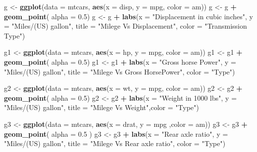 \documentclass[
]{article}
\newenvironment{Shaded}{\begin{snugshade}}{\end{snugshade}}
\newcommand{\DataTypeTok}[1]{\textcolor[rgb]{0.13,0.29,0.53}{#1}}
\newcommand{\FloatTok}[1]{\textcolor[rgb]{0.00,0.00,0.81}{#1}}
\newcommand{\KeywordTok}[1]{\textcolor[rgb]{0.13,0.29,0.53}{\textbf{#1}}}
\newcommand{\NormalTok}[1]{#1}
\newcommand{\OperatorTok}[1]{\textcolor[rgb]{0.81,0.36,0.00}{\textbf{#1}}}
\newcommand{\StringTok}[1]{\textcolor[rgb]{0.31,0.60,0.02}{#1}}
\begin{document}
\begin{Shaded}
\begin{Highlighting}[]
\NormalTok{g <-}\StringTok{ }\KeywordTok{ggplot}\NormalTok{(}\DataTypeTok{data =}\NormalTok{ mtcars, }\KeywordTok{aes}\NormalTok{(}\DataTypeTok{x =}\NormalTok{ disp, }\DataTypeTok{y =}\NormalTok{ mpg, }\DataTypeTok{color =}\NormalTok{ am))}
\NormalTok{g <-}\StringTok{ }\NormalTok{g }\OperatorTok{+}\StringTok{ }\KeywordTok{geom_point}\NormalTok{( }\DataTypeTok{alpha =} \FloatTok{0.5}\NormalTok{)}
\NormalTok{g <-}\StringTok{ }\NormalTok{g }\OperatorTok{+}\StringTok{ }\KeywordTok{labs}\NormalTok{(}\DataTypeTok{x =} \StringTok{"Displacement in cubic inches"}\NormalTok{, }\DataTypeTok{y =} \StringTok{"Miles/(US) gallon"}\NormalTok{, }\DataTypeTok{title =} \StringTok{"Milege Vs Displacement"}\NormalTok{, }\DataTypeTok{color =} \StringTok{"Transmission Type"}\NormalTok{)}

\NormalTok{g1 <-}\StringTok{ }\KeywordTok{ggplot}\NormalTok{(}\DataTypeTok{data =}\NormalTok{ mtcars, }\KeywordTok{aes}\NormalTok{(}\DataTypeTok{x =}\NormalTok{ hp, }\DataTypeTok{y =}\NormalTok{ mpg, }\DataTypeTok{color =}\NormalTok{ am))}
\NormalTok{g1 <-}\StringTok{ }\NormalTok{g1 }\OperatorTok{+}\StringTok{ }\KeywordTok{geom_point}\NormalTok{( }\DataTypeTok{alpha =} \FloatTok{0.5}\NormalTok{)}
\NormalTok{g1 <-}\StringTok{ }\NormalTok{g1 }\OperatorTok{+}\StringTok{ }\KeywordTok{labs}\NormalTok{(}\DataTypeTok{x =} \StringTok{"Gross horse Power"}\NormalTok{, }\DataTypeTok{y =} \StringTok{"Miles/(US) gallon"}\NormalTok{, }\DataTypeTok{title =} \StringTok{"Milege Vs Gross HorsePower"}\NormalTok{, }\DataTypeTok{color =} \StringTok{"Type"}\NormalTok{)}

\NormalTok{g2 <-}\StringTok{ }\KeywordTok{ggplot}\NormalTok{(}\DataTypeTok{data =}\NormalTok{ mtcars, }\KeywordTok{aes}\NormalTok{(}\DataTypeTok{x =}\NormalTok{ wt, }\DataTypeTok{y =}\NormalTok{ mpg, }\DataTypeTok{color =}\NormalTok{ am))}
\NormalTok{g2 <-}\StringTok{ }\NormalTok{g2 }\OperatorTok{+}\StringTok{ }\KeywordTok{geom_point}\NormalTok{( }\DataTypeTok{alpha =} \FloatTok{0.5}\NormalTok{)}
\NormalTok{g2 <-}\StringTok{ }\NormalTok{g2 }\OperatorTok{+}\StringTok{ }\KeywordTok{labs}\NormalTok{(}\DataTypeTok{x =} \StringTok{"Weight in 1000 lbs"}\NormalTok{, }\DataTypeTok{y =} \StringTok{"Miles/(US) gallon"}\NormalTok{, }\DataTypeTok{title =} \StringTok{"Milege Vs Weight"}\NormalTok{,}\DataTypeTok{color =} \StringTok{"Type"}\NormalTok{)}

\NormalTok{g3 <-}\StringTok{ }\KeywordTok{ggplot}\NormalTok{(}\DataTypeTok{data =}\NormalTok{ mtcars, }\KeywordTok{aes}\NormalTok{(}\DataTypeTok{x =}\NormalTok{ drat, }\DataTypeTok{y =}\NormalTok{ mpg ,}\DataTypeTok{color =}\NormalTok{ am))}
\NormalTok{g3 <-}\StringTok{ }\NormalTok{g3 }\OperatorTok{+}\StringTok{ }\KeywordTok{geom_point}\NormalTok{( }\DataTypeTok{alpha =} \FloatTok{0.5}\NormalTok{ )}
\NormalTok{g3 <-}\StringTok{ }\NormalTok{g3 }\OperatorTok{+}\StringTok{ }\KeywordTok{labs}\NormalTok{(}\DataTypeTok{x =} \StringTok{"Rear axle ratio"}\NormalTok{, }\DataTypeTok{y =} \StringTok{"Miles/(US) gallon"}\NormalTok{, }\DataTypeTok{title =} \StringTok{"Milege Vs Rear axle ratio"}\NormalTok{, }\DataTypeTok{color =} \StringTok{"Type"}\NormalTok{)}



\end{Highlighting}
\end{Shaded}
\end{document}
